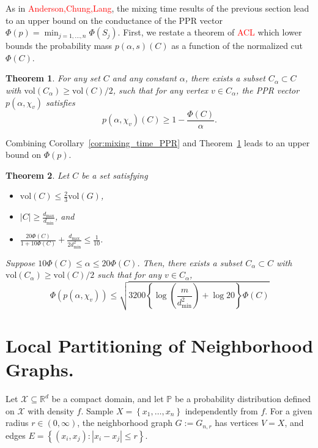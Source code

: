 \documentclass{article}
\newcommand{\Reals}{\mathbb{R}}
\newcommand{\abs}[1]{\left \lvert #1 \right \rvert}
\newcommand{\vol}{\mathrm{vol}}
\newcommand{\set}[1]{\left\{#1\right\}}
\newcommand{\1}{\mathbf{1}}
\theoremstyle{alden}
\theoremstyle{aldenthm}
\newtheorem{theorem}{Theorem}
\theoremstyle{remark}
\begin{document}
As in \textcolor{red}{Anderson,Chung,Lang}, the mixing time results of the previous section lead to an upper bound on the conductance of the PPR vector $\Phi(p) = \min_{j = 1,\ldots,n} \Phi(S_j)$. First, we restate a theorem of \textcolor{red}{ACL} which lower bounds the probability mass $p(\alpha,s)(C)$ as a function of the normalized cut $\Phi(C)$.
\begin{theorem}
	\label{thm:acl_3}
	For any set $C$ and any constant $\alpha$, there exists a subset $C_{\alpha} \subset C$ with $\vol(C_{\alpha}) \geq \vol(C)/2$, such that for any vertex $v \in C_{\alpha}$, the PPR vector $p(\alpha,\chi_v)$ satisfies
	\begin{equation*}
	p(\alpha,\chi_v)(C) \geq 1 - \frac{\Phi(C)}{\alpha}.
	\end{equation*}
\end{theorem}

Combining Corollary~\ref{cor:mixing_time_PPR} and Theorem~\ref{thm:acl_3} leads to an upper bound on $\Phi(p)$.
\begin{theorem}
	\label{thm:conductance_ppr}
	Let $C$ be a set satisfying
	\begin{itemize}
		\item $\vol(C) \leq \frac{2}{3}\vol(G)$,
		\item $\abs{C} \geq \frac{d_{\max}}{d_{\min}}$, and
		\item $\frac{20\Phi(C)}{1 + 10\Phi(C)} + \frac{d_{\max}}{2d_{\min}^2} \leq \frac{1}{10}$.
	\end{itemize}
Suppose $10\Phi(C) \leq \alpha \leq 20\Phi(C)$. Then, there exists a subset $C_{\alpha} \subset C$ with $\vol(C_{\alpha}) \geq \vol(C)/2$ such that for any $v \in C_{\alpha}$,
\begin{equation*}
\Phi(p(\alpha,\chi_v)) \leq \sqrt{3200\left\{\log\left(\frac{m}{d_{\min}^2}\right) + \log 20\right\} \Phi(C)}
\end{equation*}
\end{theorem}

\section{Local Partitioning of Neighborhood Graphs.}

Let $\mathcal{X} \subseteq \Reals^d$ be a compact domain, and let $\mathbb{P}$ be a probability distribution defined on $\mathcal{X}$ with density $f$. Sample $X = \set{x_1,\ldots,x_n}$ independently from $f$. For a given radius $r \in (0,\infty)$, the neighborhood graph $G := G_{n,r}$ has vertices $V = X$, and edges $E = \set{(x_i,x_j): \abs{x_i - x_j} \leq r}$. 
\end{document}
